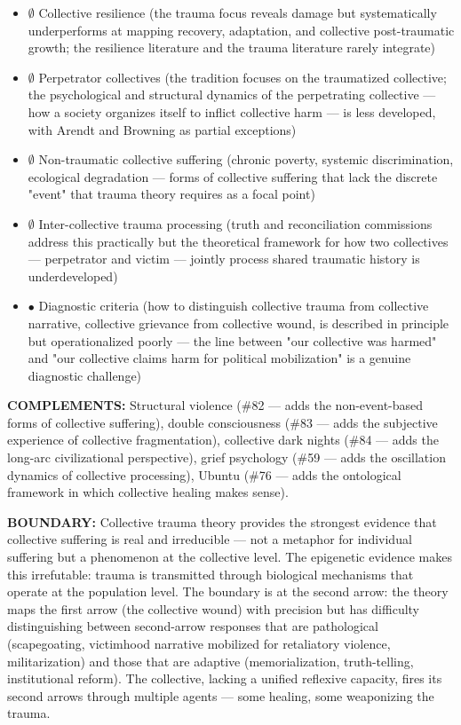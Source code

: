 \begin{itemize}[nosep,leftmargin=*]
  \item $\emptyset$ Collective resilience (the trauma focus reveals damage but systematically underperforms at mapping recovery, adaptation, and collective post-traumatic growth; the resilience literature and the trauma literature rarely integrate)
  \item $\emptyset$ Perpetrator collectives (the tradition focuses on the traumatized collective; the psychological and structural dynamics of the perpetrating collective — how a society organizes itself to inflict collective harm — is less developed, with Arendt and Browning as partial exceptions)
  \item $\emptyset$ Non-traumatic collective suffering (chronic poverty, systemic discrimination, ecological degradation — forms of collective suffering that lack the discrete "event" that trauma theory requires as a focal point)
  \item $\emptyset$ Inter-collective trauma processing (truth and reconciliation commissions address this practically but the theoretical framework for how two collectives — perpetrator and victim — jointly process shared traumatic history is underdeveloped)
  \item $\bullet$ Diagnostic criteria (how to distinguish collective trauma from collective narrative, collective grievance from collective wound, is described in principle but operationalized poorly — the line between "our collective was harmed" and "our collective claims harm for political mobilization" is a genuine diagnostic challenge)
\end{itemize}


\textbf{COMPLEMENTS:} Structural violence (\#82 — adds the non-event-based forms of collective suffering), double consciousness (\#83 — adds the subjective experience of collective fragmentation), collective dark nights (\#84 — adds the long-arc civilizational perspective), grief psychology (\#59 — adds the oscillation dynamics of collective processing), Ubuntu (\#76 — adds the ontological framework in which collective healing makes sense).


\textbf{BOUNDARY:} Collective trauma theory provides the strongest evidence that collective suffering is real and irreducible — not a metaphor for individual suffering but a phenomenon at the collective level. The epigenetic evidence makes this irrefutable: trauma is transmitted through biological mechanisms that operate at the population level. The boundary is at the second arrow: the theory maps the first arrow (the collective wound) with precision but has difficulty distinguishing between second-arrow responses that are pathological (scapegoating, victimhood narrative mobilized for retaliatory violence, militarization) and those that are adaptive (memorialization, truth-telling, institutional reform). The collective, lacking a unified reflexive capacity, fires its second arrows through multiple agents — some healing, some weaponizing the trauma.


